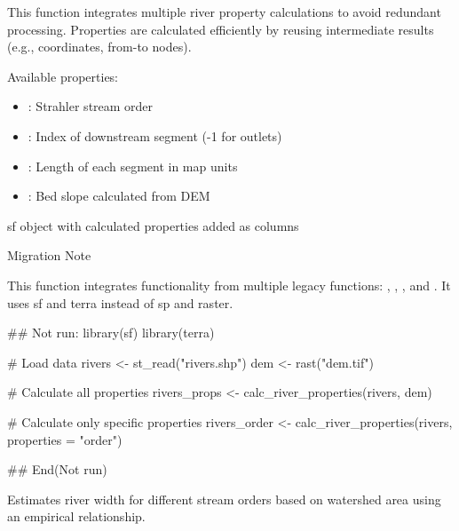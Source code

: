 \documentclass[a4paper]{book}
\begin{document}
%
\begin{Details}\relax
This function integrates multiple river property calculations to avoid
redundant processing. Properties are calculated efficiently by reusing
intermediate results (e.g., coordinates, from-to nodes).

Available properties:
\begin{itemize}

\item{} : Strahler stream order
\item{} : Index of downstream segment (-1 for outlets)
\item{} : Length of each segment in map units
\item{} : Bed slope calculated from DEM

\end{itemize}

\end{Details}
%
\begin{Value}
sf object with calculated properties added as columns
\end{Value}
%
\begin{Section}{Migration Note}

This function integrates functionality from multiple legacy functions:
, , ,
and . It uses sf and terra instead of sp and raster.
\end{Section}
%
\begin{Examples}
\begin{ExampleCode}
## Not run: 
library(sf)
library(terra)

# Load data
rivers <- st_read("rivers.shp")
dem <- rast("dem.tif")

# Calculate all properties
rivers_props <- calc_river_properties(rivers, dem)

# Calculate only specific properties
rivers_order <- calc_river_properties(rivers, properties = "order")

## End(Not run)
\end{ExampleCode}
\end{Examples}
%
\begin{Description}\relax
Estimates river width for different stream orders based on watershed area
using an empirical relationship.
\end{Description}
\end{document}
